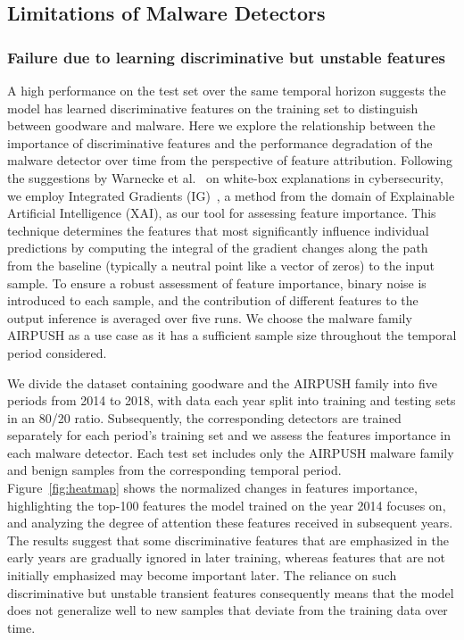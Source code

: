 
\subsection{Limitations of Malware Detectors}
\subsubsection{Failure due to learning discriminative but unstable features}
A high performance on the test set over the same temporal horizon suggests the model has learned discriminative features on the training set to distinguish between goodware and malware. Here we explore the relationship between the importance of discriminative features and the performance degradation of the malware detector over time from the perspective of feature attribution. Following the suggestions by Warnecke et al.~\cite{IG_explain} on white-box explanations in cybersecurity, we employ Integrated Gradients (IG)~\cite{IG}, a method from the domain of Explainable Artificial Intelligence (XAI), as our tool for assessing feature importance. This technique determines the features that most significantly influence individual predictions by computing the integral of the gradient changes along the path from the baseline (typically a neutral point like a vector of zeros) to the input sample. To ensure a robust assessment of feature importance, binary noise is introduced to each sample, and the contribution of different features to the output inference is averaged over five runs. We choose the malware family AIRPUSH as a use case as it has a sufficient sample size throughout the temporal period considered.

We divide the dataset containing goodware and the AIRPUSH family into five periods from 2014 to 2018, with data each year split into training and testing sets in an 80/20 ratio. Subsequently, the corresponding detectors are trained separately for each period's training set and we assess the features importance in each malware detector. Each test set includes only the AIRPUSH malware family and benign samples from the corresponding temporal period. Figure~\ref{fig:heatmap} shows the normalized changes in features importance, highlighting the top-100 features the model trained on the year 2014 focuses on, and analyzing the degree of attention these features received in subsequent years. The results suggest that some discriminative features that are emphasized in the early years are gradually ignored in later training, whereas features that are not initially emphasized may become important later. The reliance on such discriminative but unstable transient features consequently means that the model does not generalize well to new samples that deviate from the training data over time. 


